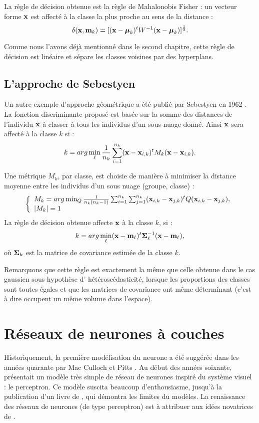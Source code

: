 La r\`egle de d\'ecision obtenue est la r\`egle de Mahalonobis Fisher : un vecteur
forme $\mbox{\bf x}$ est affect\'e \`a la classe la plus proche au sens de la distance  : 
$$
\delta(\mbox{\bf x},\mbox{\bf m}_k)=[(\mbox{\bf x} - \mbox{\boldmath $\mu$}_k)^t W^{-1} (\mbox{\bf x} - \mbox{\boldmath $\mu$}_k)]^{\frac{1}{2}}.
$$ 

Comme nous l'avons d\'ej\`a mentionn\'e dans le second chapitre, cette 
r\`egle de d\'ecision est lin\'eaire et s\'epare les classes voisines par
des hyperplans. 



\subsection{L'approche de Sebestyen}

Un autre exemple d'approche g\'eom\'etrique a \'et\'e publi\'e par Sebestyen en 1962 
\cite{Romeder1973}. La fonction discriminante propos\'e est bas\'ee sur la somme
des distances de l'individu $\mbox{\bf x}$ \`a classer \`a tous les individus d'un 
sous-nuage donn\'e. Ainsi $\mbox{\bf x}$ sera affect\'e \`a la classe $k$ si :
$$
k=arg \min_{\ell} \frac{1}{n_k} \sum_{i=1}^{n_k} (\mbox{\bf x} - \mbox{\bf x}_{i,k})^t M_k (\mbox{\bf x} - \mbox{\bf x}_{i,k}).
$$ 

Une  m\'etrique $M_k$, par classe, est choisie de mani\`ere \`a minimiser
la distance moyenne entre les individus d'un sous nuage (groupe, classe) :
$$
\left \{ \begin{array}{l}
M_k= arg \min_Q \frac{1}{n_k(n_k-1)}  \sum_{i=1}^{n_k} \sum_{j=1}^{n_k} (\mbox{\bf x}_{i,k}-
\mbox{\bf x}_{j,k})^t Q (\mbox{\bf x}_{i,k}-\mbox{\bf x}_{j,k}), \\
|M_k|=1\\
\end{array}
\right .
$$
La r\`egle de d\'ecision obtenue affecte $\mbox{\bf x}$ \`a la classe $k$, si :
$$
k=arg \min_{\ell}  (\mbox{\bf x} - \mbox{\bf m}_{\ell})^t \mbox{\boldmath $\Sigma$}_\ell^{-1} (\mbox{\bf x} - \mbox{\bf m}_{\ell}),
$$
o\`u $\mbox{\boldmath $\Sigma$}_k$ est la matrice de covariance estim\'ee de la classe $k$. 

Remarquons que cette r\`egle est exactement la m\^eme que celle obtenue dans le 
cas gaussien sous hypoth\`ese d' h\'et\'erosc\'edasticit\'e, lorsque les 
proportions des classes sont toutes \'egales et que les matrices de covariance
ont m\^eme d\'eterminant (c'est \`a dire occupent un m\^eme volume dans l'espace).


\section{R\'eseaux de neurones \`a couches}

Historiquement, la premi\`ere mod\'elisation du neurone a \'et\'e sugg\'er\'ee
dans les ann\'ees quarante par Mac Culloch et Pitts \cite{Davalo1992}.
Au d\'ebut des ann\'ees soixante,  pr\'esentait
un mod\`ele tr\`es simple de r\'eseau de neurones inspir\'e
du syst\`eme visuel : le perceptron. Ce mod\`ele suscita beaucoup d'enthousiasme,
jusqu'\`a la publication d'un livre de , qui d\'emontra
les  limites du mod\`eles. La renaissance des r\'eseaux de neurones (de type perceptron)
est \`a attribuer aux id\'ees novatrices de .

